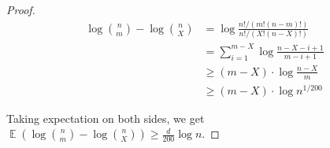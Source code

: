 \documentclass[10pt]{article}
\DeclareMathOperator*{\E}{\mathbb{E}}
\begin{document}
\begin{proof}
  \begin{align*}
  \log {n \choose m}-\log {n \choose X}
  &=   \log \frac{n!/(m!(n-m)!)}{n!/(X!(n-X)!)} \\
  &=   \sum_{i=1}^{m-X}\log \frac{n-X-i+1}{m-i+1} \\
  &\ge (m-X)\cdot \log \frac{n-X}{m} \\
  &\ge (m-X)\cdot \log n^{1/200}
  \end{align*}
  
  Taking expectation on both sides, we get $\E(\log {n \choose m}-\log {n \choose X})\ge \frac{d}{200} \log n$. 
\end{proof}




\end{document}
